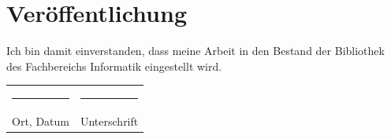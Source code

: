 \documentclass[
	12pt,
	a4paper,
	BCOR10mm,
	DIV14,
	headsepline,
	usegeometry,
]{scrreprt}
\begin{document}
\vfill

\section*{Veröffentlichung}

\begin{otherlanguage}{ngerman}
Ich bin damit einverstanden, dass meine Arbeit in den Bestand der Bibliothek des Fachbereichs Informatik eingestellt wird.
\end{otherlanguage}

\vspace{1cm}

\begin{center}
\begin{tabular}{ll}
	\rule{0.35\textwidth}{0.4pt} & \rule{0.55\textwidth}{0.4pt} \\
	Ort, Datum & Unterschrift
\end{tabular}
\end{center}
\end{document}
